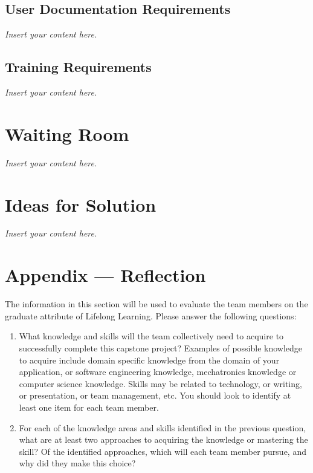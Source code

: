 \documentclass[12pt]{article}
\newcommand{\lips}{\textit{Insert your content here.}}
\begin{document}
\subsection{User Documentation Requirements}
\lips
\subsection{Training Requirements}
\lips

\section{Waiting Room}
\lips

\section{Ideas for Solution}
\lips

\newpage{}
\section*{Appendix --- Reflection}

The information in this section will be used to evaluate the team members on the
graduate attribute of Lifelong Learning.  Please answer the following questions:

\begin{enumerate}
  \item What knowledge and skills will the team collectively need to acquire to
  successfully complete this capstone project?  Examples of possible knowledge
  to acquire include domain specific knowledge from the domain of your
  application, or software engineering knowledge, mechatronics knowledge or
  computer science knowledge.  Skills may be related to technology, or writing,
  or presentation, or team management, etc.  You should look to identify at
  least one item for each team member.
  \item For each of the knowledge areas and skills identified in the previous
  question, what are at least two approaches to acquiring the knowledge or
  mastering the skill?  Of the identified approaches, which will each team
  member pursue, and why did they make this choice?
\end{enumerate}
\end{document}
